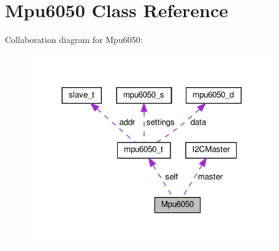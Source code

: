 \hypertarget{classMpu6050}{}\section{Mpu6050 Class Reference}
\label{classMpu6050}


Collaboration diagram for Mpu6050\+:\nopagebreak
\begin{figure}[H]
\begin{center}
\leavevmode
\includegraphics[width=299pt]{classMpu6050__coll__graph}
\end{center}
\end{figure}
